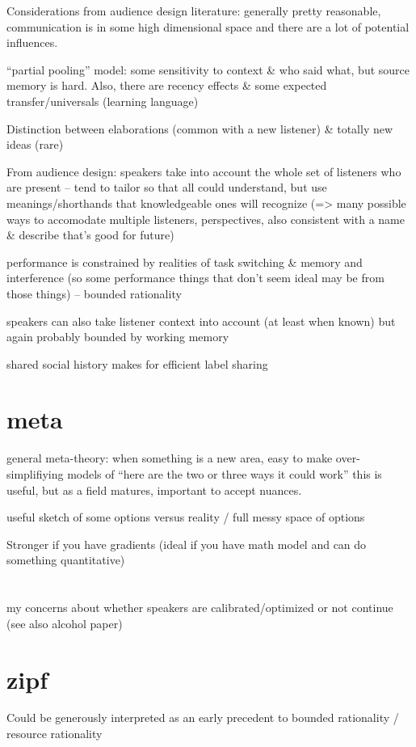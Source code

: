 \documentclass[]{article}
\begin{document}
Considerations from audience design literature: generally pretty reasonable, communication is in some high dimensional space and there are a lot of potential influences. 

``partial pooling'' model: some sensitivity to context \& who said what, but source memory is hard. Also, there are recency effects \& some expected transfer/universals (learning language) 

Distinction between elaborations (common with a new listener) \& totally new ideas (rare)

From audience design: speakers take into account the whole set of listeners who are present -- tend to tailor so that all could understand, but use meanings/shorthands that knowledgeable ones will recognize (=> many possible ways to accomodate multiple listeners, perspectives, also consistent with a name \& describe that's good for future) 

performance is constrained by realities of task switching \& memory and interference (so some performance things that don't seem ideal may be from those things) -- bounded rationality 

speakers can also take listener context into account (at least when known) but again probably bounded by working memory

shared social history makes for efficient label sharing 


\section{meta}
general meta-theory: when something is a new area, easy to make over-simplifiying models of “here are the two or three ways it could work” this is useful, but as a field matures, important to accept nuances.

useful sketch of some options versus reality / full messy space of options

Stronger if you have gradients (ideal if you have math model and can do something quantitative)

\section{}

my concerns about whether speakers are calibrated/optimized or not continue (see also alcohol paper) 

\section{zipf}
Could be generously interpreted as an early precedent to bounded rationality / resource rationality 
\end{document}
